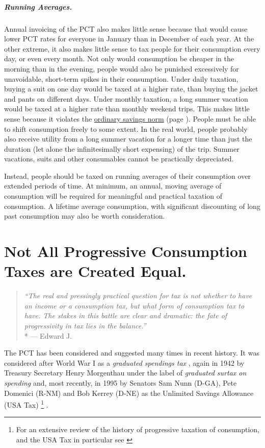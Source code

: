 \subparagraph{Running Averages.} Annual invoicing of the PCT also makes little sense because that would cause lower PCT rates for everyone in January than in December of each year.
At the other extreme, it also makes little sense to tax people for their consumption every day, or even every month.
Not only would consumption be cheaper in the morning than in the evening, people would also be punished excessively for unavoidable, short-term spikes in their consumption.
Under daily taxation, buying a suit on one day would be taxed at a higher rate, than buying the jacket and pants on different days.
Under monthly taxation, a long summer vacation would be taxed at a higher rate than monthly weekend trips.
This makes little sense because it violates the \hyperref[sec:OSN]{ordinary savings norm} (page \pageref{sec:OSN}).
People must be able to shift consumption freely to some extent.
In the real world, people probably also receive utility from a long summer vacation for a longer time than just the duration (let alone the infinitesimally short expensing) of the trip.
Summer vacations, suits and other consumables cannot be practically depreciated.

Instead, people should be taxed on running averages of their consumption over extended periods of time.
At minimum, an annual, moving average of consumption will be required for meaningful and practical taxation of consumption.
A lifetime average consumption, with significant discounting of long past consumption may also be worth consideration.


\section[The PCT's Evil Twins]{Not All Progressive Consumption Taxes are Created Equal.}

\begin{quote}
	\emph{``The real and pressingly practical question for tax is not whether to have an income or a consumption tax, but what form of consumption tax to have.
	The stakes in this battle are clear and dramatic:
	the fate of progressivity in tax lies in the balance.''}
	\\*
	--- Edward J.\ \citet[817]{McCaffery2005}
\end{quote}

 \label{sec:PCTTwins} The PCT has been considered and suggested many times in recent history.
It was considered after World War I as a \emph{graduated spendings tax} \citep[2]{Bank2004}, again in 1942 by Treasury Secretary Henry Morgenthau under the label of \emph{graduated surtax on spending} and, most recently, in 1995 by Senators Sam Nunn (D-GA), Pete Domenici (R-NM) and Bob Kerrey (D-NE) as the Unlimited Savings Allowance (USA Tax)
\footnote{
	For an extensive review of the history of progressive taxation of consumption, and the USA Tax in particular see \citealt[11ff]{Seidman1997}
}
.

